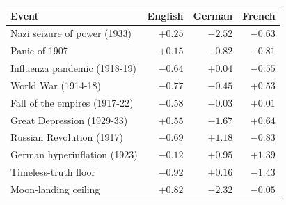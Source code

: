 \begin{tabular}{lrrr}
\toprule
Event & English & German & French \\
\midrule
Nazi seizure of power (1933) & $+0.25$ & $-2.52$ & $-0.63$ \\
Panic of 1907 & $+0.15$ & $-0.82$ & $-0.81$ \\
Influenza pandemic (1918-19) & $-0.64$ & $+0.04$ & $-0.55$ \\
World War (1914-18) & $-0.77$ & $-0.45$ & $+0.53$ \\
Fall of the empires (1917-22) & $-0.58$ & $-0.03$ & $+0.01$ \\
Great Depression (1929-33) & $+0.55$ & $-1.67$ & $+0.64$ \\
Russian Revolution (1917) & $-0.69$ & $+1.18$ & $-0.83$ \\
German hyperinflation (1923) & $-0.12$ & $+0.95$ & $+1.39$ \\
\midrule
Timeless-truth floor & $-0.92$ & $+0.16$ & $-1.43$ \\
Moon-landing ceiling & $+0.82$ & $-2.32$ & $-0.05$ \\
\bottomrule
\end{tabular}